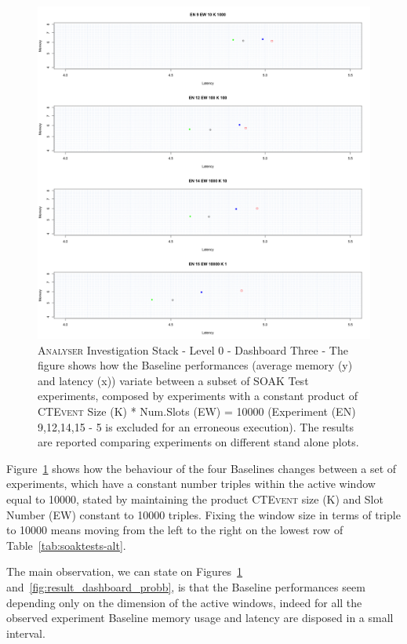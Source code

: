 \begin{figure}[h!tbp]
	\centering
	\includegraphics[width=0.75\linewidth]{images/dashboard-3-split}	
	\caption[\textsc{Analyser} Investigation Stack - Level 0 - Dashboard Three - Split Version]	{\textsc{Analyser} Investigation Stack - Level 0 - Dashboard Three - The figure shows how the Baseline performances (average memory (y) and latency (x)) variate between a subset of SOAK Test experiments, composed by experiments with a constant product of \textsc{CTEvent} Size (K) * Num.Slots (EW) = 10000 (Experiment (EN) 9,12,14,15 - 5 is excluded for an erroneous execution).  The results are reported comparing experiments on different stand alone plots.}
	\label{fig:result_dashboard_proba}
\end{figure}

Figure~\ref{fig:result_dashboard_proba}  shows how the behaviour of the four Baselines changes between a set of experiments, which have a constant number triples within the active window equal to 10000, stated by maintaining the product \textsc{CTEvent} size (K) and Slot Number (EW) constant to 10000 triples. Fixing the window size in terms of triple to 10000 means moving from the left to the right on the lowest row of Table~\ref{tab:soaktests-alt}. 

The main observation, we can state on Figures~\ref{fig:result_dashboard_proba} and~\ref{fig:result_dashboard_probb}, is that the Baseline performances seem depending only on the dimension of the active windows, indeed for all the observed experiment Baseline memory usage and latency are disposed in a small interval.

